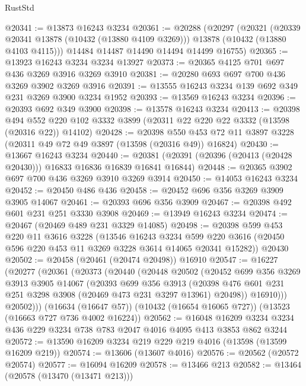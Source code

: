 \begin{lexlean}{RustStd}
\begin{coremodule}
@20341 := @13873 @16243 @3234
@20361 := @20288
    (@20297
      (@20321
        (@20339 @20341 @13878 (@10432 (@13880 @4109 @3269)))
        @13878
        (@10432 (@13880 @4103 @4115)))
      @14484
      @14487
      @14490
      @14494
      @14499
      @16755)
@20365 := @13923 @16243 @3234 @3234 @13927
@20373 := @20365 @4125 @701 @697 @436 @3269 @3916 @3269 @3910
@20381 := @20280 @693 @697 @700 @436 @3269 @3902 @3269 @3916
@20391 := @13555 @16243 @3234 @139 @692 @349 @231 @3269 @3900 @3234 @1952
@20393 := @13569 @16243 @3234
@20396 := @20393 @692 @349 @3900
@20398 := @13578 @16243 @3234
@20413 := @20398
    @494
    @552
    @220
    @102
    @3332
    @3899
    (@20311 @22 @220 @22 @3332 (@13598 (@20316 @22)) @14102)
@20428 := @20398
    @550
    @453
    @72
    @11
    @3897
    @3228
    (@20311 @49 @72 @49 @3897 (@13598 (@20316 @49)) @16824)
@20430 := @13667 @16243 @3234
@20440 := @20381 (@20391 (@20396 (@20413 (@20428 @20430))) @16833 @16836 @16839 @16841 @16844)
@20448 := @20365 @3902 @697 @700 @436 @3269 @3910 @3269 @3914
@20450 := @14053 @16243 @3234
@20452 := @20450 @486 @436
@20458 := @20452 @696 @356 @3269 @3909 @3905 @14067
@20461 := @20393 @696 @356 @3909
@20467 := @20398 @492 @601 @231 @251 @3330 @3908
@20469 := @13949 @16243 @3234
@20474 := @20467 (@20469 @489 @231 @3329 @14085)
@20498 := @20398
    @599
    @453
    @220
    @11
    @3616
    @3228
    (@13546
      @16243
      @3234
      @599
      @220
      @3616
      (@20450 @596 @220 @453 @11 @3269 @3228 @3614 @14065 @20341 @15282))
    @20430
@20502 := @20458 (@20461 (@20474 @20498)) @16910
@20547 := @16227
    (@20277
      (@20361
        (@20373
          (@20440
            (@20448
              @20502
              (@20452
                @699
                @356
                @3269
                @3913
                @3905
                @14067
                (@20393
                  @699
                  @356
                  @3913
                  (@20398 @476 @601 @231 @251 @3298 @3908 (@20469 @473 @231 @3297 @13961) @20498))
                @16910)))
          @20502)))
    (@16634 (@16647 @57))
    (@10432 (@16654 @16065 @727))
    (@13523 (@16663 @727 @736 @4002 @16224))
@20562 := @16048
    @16209
    @3234
    @3234
    @436
    @229
    @3234
    @738
    @783
    @2047
    @4016
    @4095
    @413
    @3853
    @862
    @3244
@20572 := @13590 @16209 @3234 @219 @229 @219 @4016 (@13598 (@13599 @16209 @219))
@20574 := @13606 (@13607 @4016)
@20576 := @20562 (@20572 @20574)
@20577 := @16094 @16209
@20578 := @13466 @213
@20582 := @13464 (@20578 (@13470 (@13471 @213)))

\end{coremodule}
\end{lexlean}
